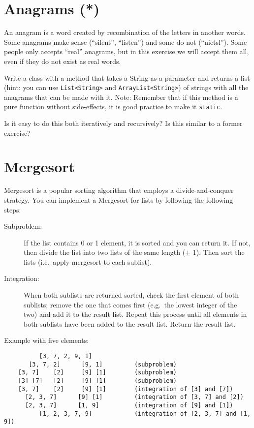 \documentclass{article}
\begin{document}
\section{Anagrams (*)}
\label{sec:anagrams}

An anagram is a word created by recombination of the letters in
another words. Some anagrams make sense (``silent'', ``listen'') and
some do not (``nietsl''). Some people only accepts ``real'' anagrams,
but in this exercise we will accept them all, even if they do not
exist as real words. 

Write a class with a method that takes a String as a parameter
and returns a list (hint: you can use \verb+List<String>+ and
\verb+ArrayList<String>+) of strings with all the anagrams that can be
made with it. Note: Remember that if this method is a pure function
without side-effects, it is good practice to make it \verb+static+. 

Is it easy to do this both iteratively and recursively? Is this
similar to a former exercise?

\section{Mergesort}
\label{sec:mergesort}

Mergesort is a popular sorting algorithm that employs a
divide-and-conquer strategy. You can implement a Mergesort for lists
by following the following steps: 

\begin{description}
\item[Subproblem: ] If the list contains 0 or 1 element, it is sorted
  and you can return it. If not, then divide the list into two lists
  of the same length ($\pm$ 1). Then sort the lists (i.e.~apply
  mergesort to each sublist).
\item[Integration: ] When both sublists are returned sorted, check the
  first element of both sublists; remove the one that comes first
  (e.g.~the lowest integer of the two) and add it to the result
  list. Repeat this process until all elements in both sublists have
  been added to the result list. Return the result list. 
\end{description}

Example with five elements: 

\begin{verbatim}
          [3, 7, 2, 9, 1]            
       [3, 7, 2]      [9, 1]         (subproblem)
    [3, 7]    [2]     [9] [1]        (subproblem)
    [3] [7]   [2]     [9] [1]        (subproblem)
    [3, 7]    [2]     [9] [1]        (integration of [3] and [7])
      [2, 3, 7]      [9] [1]         (integration of [3, 7] and [2])
      [2, 3, 7]      [1, 9]          (integration of [9] and [1])
          [1, 2, 3, 7, 9]            (integration of [2, 3, 7] and [1, 9])
\end{verbatim}
\end{document}
